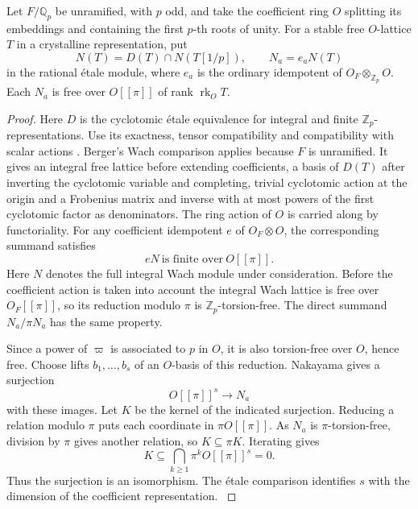 \begin{auxlemma}\label{lem:covariant-wach-factor-free}
Let \(F/\mathbb Q_p\) be unramified, with \(p\) odd, and take the
coefficient ring \(O\) splitting its embeddings and containing the
first \(p\)-th roots of unity. For a stable free \(O\)-lattice \(T\)
in a crystalline representation, put
\[
 N(T)=D(T)\cap N(T[1/p]),\qquad N_a=e_aN(T)
\]
in the rational \'etale module, where \(e_a\) is the ordinary
idempotent of \(O_F\otimes_{\mathbb Z_p}O\). Each \(N_a\) is
free over \(O[[\pi]]\) of rank \(\operatorname{rk}_O T\).
\end{auxlemma}
\begin{proof}
Here \(D\) is the cyclotomic \'etale equivalence for integral
and finite \(\mathbb Z_p\)-representations. Use its
exactness, tensor compatibility and compatibility with scalar
actions \cite[Theorem A.3.4.3]{fontaine-etale}. Berger's Wach
comparison applies because \(F\) is unramified. It gives an
integral free lattice before extending coefficients, a basis of
\(D(T)\) after inverting the cyclotomic variable and completing,
trivial cyclotomic action at the origin and a Frobenius matrix
and inverse with at most powers of the first cyclotomic factor
as denominators. The ring action of \(O\) is carried along by
functoriality. For any coefficient idempotent \(e\) of \(O_F\otimes O\), the corresponding summand satisfies
\[
 eN\ \text{is finite over}\ O[[\pi]].
\]
Here \(N\) denotes the full integral Wach module under consideration. Before the coefficient
action is taken into account the integral Wach lattice is free
over \(O_F[[\pi]]\), so its reduction modulo \(\pi\) is
\(\mathbb Z_p\)-torsion-free. The direct summand \(N_a/\pi N_a\)
has the same property.

Since a power of \(\varpi\) is associated
to \(p\) in \(O\), it is also torsion-free over \(O\), hence free.
Choose lifts \(b_1,\ldots,b_s\) of an \(O\)-basis of this reduction. Nakayama gives a surjection
\[
 O[[\pi]]^s\to N_a
\]
with these images. Let \(K\) be the kernel of the indicated surjection. Reducing
a relation modulo \(\pi\) puts each coordinate in
\(\pi O[[\pi]]\). As \(N_a\) is \(\pi\)-torsion-free, division
by \(\pi\) gives another relation, so \(K\subseteq\pi K\).
Iterating gives
\[
       K\subseteq\bigcap_{k\ge1}\pi^k O[[\pi]]^s=0 .
\]
Thus the surjection is an isomorphism. The \'etale comparison identifies
\(s\) with the dimension of the coefficient representation.
\cite[Proposition III.4.2 and Corollary III.4.5]{berger-wach}
\end{proof}

